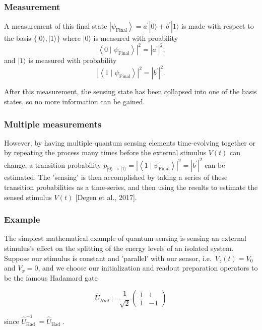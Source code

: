 \documentclass{beamer}
\begin{document}
\begin{frame}
\frametitle{Measurement}

A measurement of this final state $\left|\psi_{\text {Final
}}\right\rangle=a^{\prime}|0\rangle+b^{\prime}|1\rangle$ is made with
respect to the basis $\{|0\rangle,|1\rangle\}$ where
$|0\rangle$ is measured with proability
\[
\left|\left\langle 0 \mid \psi_{\text {Final}}\right\rangle\right|^{2}=\left|a^{\prime}\right|^{2},
\]
and $|1\rangle$ is measured with probability 
\[
\left|\left\langle 1 \mid\psi_{\text {Final}}\right\rangle\right|^{2}=\left|b^{\prime}\right|^{2}.
\]

After this
measurement, the sensing state has been collapsed into one of the
basis states, so no more information can be gained.
\end{frame}

\begin{frame}
\frametitle{Multiple measurements}

However, by having
multiple quantum sensing elements time-evolving together or by
repeating the process many times before the external stimulus $V(t)$
can change, a transition probability $p_{|0\rangle
\rightarrow|1\rangle}=\left|\left\langle 1 \mid \psi_{\text {Final
}}\right\rangle\right|^{2}=\left|b^{\prime}\right|^{2}$ can be
estimated. The 'sensing' is then accomplished by taking a series of
these transition probabilities as a time-series, and then using the
results to estimate the sensed stimulus $V(t)$ [Degen et al., 2017].
\end{frame}

\begin{frame}
\frametitle{Example}

The simplest mathematical example of quantum sensing is sensing an
external stimulus's effect on the splitting of the energy levels of an
isolated system. Suppose our stimulus is constant and 'parallel' with
our sensor, i.e.~$V_z(t)=V_{0}$ and $V_x=0$, and we choose
our initialization and readout preparation operators to be the famous
Hadamard gate

\[
\hat{U}_{H a d}=\frac{1}{\sqrt{2}}\left(\begin{array}{cc}
1 & 1 \\
1 & -1
\end{array}\right)
\]

since $\hat{U}_{\text {Had }}^{-1}=\hat{U}_{\text {Had }}$.\\
\end{frame}
\end{document}
